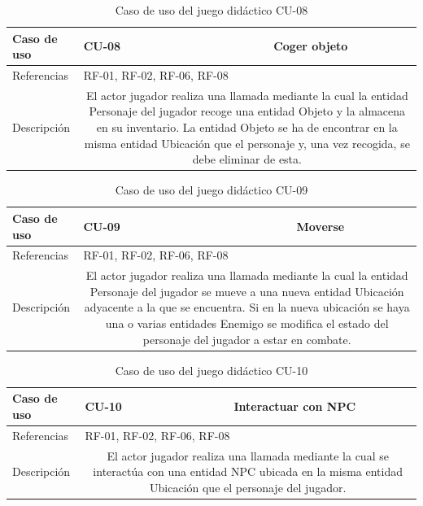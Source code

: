 \begin{table}[H]
	\centering
	\small
	\begin{tabularx}{\linewidth}{|l|cc|}
		\hline
		{\cellcolor[HTML]{C0C0C0} Caso de uso} & \multicolumn{1}{l|}{CU-08} & Coger objeto \\ \hline
		{\cellcolor[HTML]{C0C0C0} Referencias} & \multicolumn{2}{l|}{RF-01, RF-02, RF-06, RF-08} \\ \hline
		{\cellcolor[HTML]{C0C0C0} Descripción} & \multicolumn{2}{X|}{El actor jugador realiza una llamada mediante la cual la entidad Personaje del jugador recoge una entidad Objeto y la almacena en su inventario. La entidad Objeto se ha de encontrar en la misma entidad Ubicación que el personaje y, una vez recogida, se debe eliminar de esta.} \\ \hline
	\end{tabularx}
	
	\vspace{0.5cm}
	\caption{Caso de uso del juego didáctico CU-08}
	\label{tab:juego-cu-08}
\end{table}

\begin{table}[H]
	\centering
	\small
	\begin{tabularx}{\linewidth}{|l|cc|}
		\hline
		{\cellcolor[HTML]{C0C0C0} Caso de uso} & \multicolumn{1}{l|}{CU-09} & Moverse \\ \hline
		{\cellcolor[HTML]{C0C0C0} Referencias} & \multicolumn{2}{l|}{RF-01, RF-02, RF-06, RF-08} \\ \hline
		{\cellcolor[HTML]{C0C0C0} Descripción} & \multicolumn{2}{X|}{El actor jugador realiza una llamada mediante la cual la entidad Personaje del jugador se mueve a una nueva entidad Ubicación adyacente a la que se encuentra. Si en la nueva ubicación se haya una o varias entidades Enemigo se modifica el estado del personaje del jugador a estar en combate.} \\ \hline
	\end{tabularx}
	
	\vspace{0.5cm}
	\caption{Caso de uso del juego didáctico CU-09}
	\label{tab:juego-cu-09}
\end{table}

\begin{table}[H]
	\centering
	\small
	\begin{tabularx}{\linewidth}{|l|cc|}
		\hline
		{\cellcolor[HTML]{C0C0C0} Caso de uso} & \multicolumn{1}{l|}{CU-10} & Interactuar con NPC \\ \hline
		{\cellcolor[HTML]{C0C0C0} Referencias} & \multicolumn{2}{l|}{RF-01, RF-02, RF-06, RF-08} \\ \hline
		{\cellcolor[HTML]{C0C0C0} Descripción} & \multicolumn{2}{X|}{El actor jugador realiza una llamada mediante la cual se interactúa con una entidad NPC ubicada en la misma entidad Ubicación que el personaje del jugador.} \\ \hline
	\end{tabularx}
	
	\vspace{0.5cm}
	\caption{Caso de uso del juego didáctico CU-10}
	\label{tab:juego-cu-10}
\end{table}

